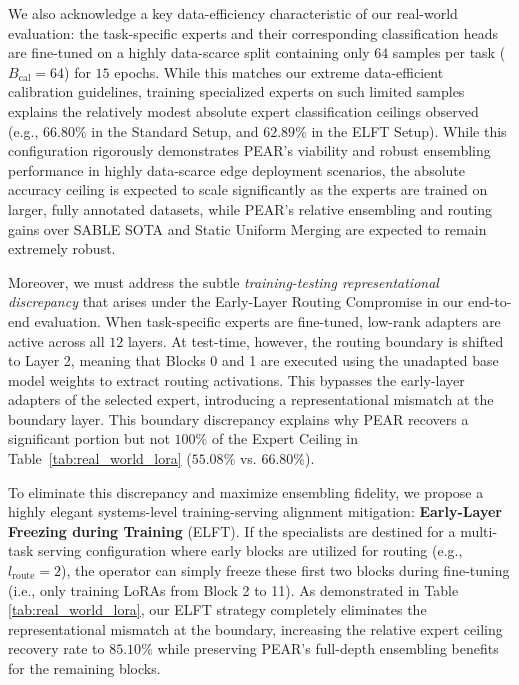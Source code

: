 We also acknowledge a key data-efficiency characteristic of our real-world evaluation: the task-specific experts and their corresponding classification heads are fine-tuned on a highly data-scarce split containing only $64$ samples per task ($B_{\text{cal}} = 64$) for $15$ epochs. While this matches our extreme data-efficient calibration guidelines, training specialized experts on such limited samples explains the relatively modest absolute expert classification ceilings observed (e.g., $66.80\%$ in the Standard Setup, and $62.89\%$ in the ELFT Setup). While this configuration rigorously demonstrates PEAR's viability and robust ensembling performance in highly data-scarce edge deployment scenarios, the absolute accuracy ceiling is expected to scale significantly as the experts are trained on larger, fully annotated datasets, while PEAR's relative ensembling and routing gains over SABLE SOTA and Static Uniform Merging are expected to remain extremely robust.

Moreover, we must address the subtle \emph{training-testing representational discrepancy} that arises under the Early-Layer Routing Compromise in our end-to-end evaluation. When task-specific experts are fine-tuned, low-rank adapters are active across all $12$ layers. At test-time, however, the routing boundary is shifted to Layer 2, meaning that Blocks 0 and 1 are executed using the unadapted base model weights to extract routing activations. This bypasses the early-layer adapters of the selected expert, introducing a representational mismatch at the boundary layer. This boundary discrepancy explains why PEAR recovers a significant portion but not $100\%$ of the Expert Ceiling in Table~\ref{tab:real_world_lora} ($55.08\%$ vs. $66.80\%$). 

To eliminate this discrepancy and maximize ensembling fidelity, we propose a highly elegant systems-level training-serving alignment mitigation: \textbf{Early-Layer Freezing during Training} (ELFT). If the specialists are destined for a multi-task serving configuration where early blocks are utilized for routing (e.g., $l_{\text{route}} = 2$), the operator can simply freeze these first two blocks during fine-tuning (i.e., only training LoRAs from Block 2 to 11). As demonstrated in Table \ref{tab:real_world_lora}, our ELFT strategy completely eliminates the representational mismatch at the boundary, increasing the relative expert ceiling recovery rate to $\mathbf{85.10\%}$ while preserving PEAR's full-depth ensembling benefits for the remaining blocks.

